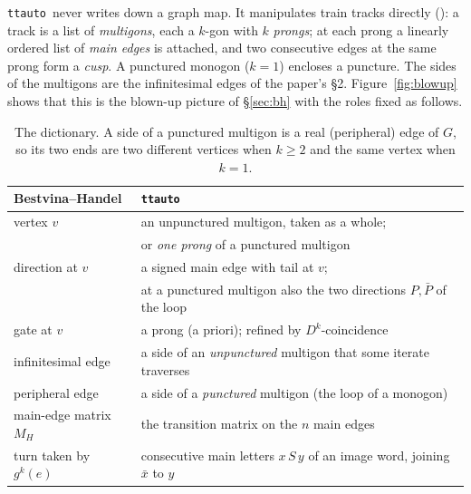 \documentclass[12pt]{amsart}
\newcommand{\anti}[1]{\bar{#1}}          %
\newcommand{\Dg}{D}                       %
\newcommand{\per}{P}                      %
\newcommand{\ttauto}{\texttt{ttauto}}
\theoremstyle{plain}
\theoremstyle{definition}
\begin{document}
\ttauto\ never writes down a graph map.  It manipulates train tracks
directly (\cite[\S2--3]{Lanneau2011}): a track is a list of
\emph{multigons}, each a $k$-gon with $k$ \emph{prongs}; at each prong a
linearly ordered list of \emph{main edges} is attached, and two consecutive
edges at the same prong form a \emph{cusp}.  A punctured monogon ($k=1$)
encloses a puncture.  The sides of the multigons are the infinitesimal
edges of the paper's \S2.  Figure~\ref{fig:blowup} shows that this is the
blown-up picture of \S\ref{sec:bh} with the roles fixed as follows.

\begin{table}[h]
  \centering
  \begin{tabular}{@{}ll@{}}
    \toprule
    Bestvina--Handel & \ttauto \\
    \midrule
    vertex $v$ & an unpunctured multigon, taken as a whole; \\
               & or \emph{one prong} of a punctured multigon \\
    direction at $v$ & a signed main edge with tail at $v$; \\
                     & at a punctured multigon also the two directions
                       $\per,\anti\per$ of the loop \\
    gate at $v$ & a prong (a priori); refined by $\Dg^k$-coincidence \\
    infinitesimal edge & a side of an \emph{unpunctured} multigon that
                         some iterate traverses \\
    peripheral edge & a side of a \emph{punctured} multigon (the loop of a
                      monogon) \\
    main-edge matrix $M_H$ & the transition matrix on the $n$ main edges \\
    turn taken by $g^k(e)$ & consecutive main letters $x\,S\,y$ of an image
                             word, joining $\anti x$ to $y$ \\
    \bottomrule
  \end{tabular}
  \caption{The dictionary.  A side of a punctured multigon is a real
    (peripheral) edge of $G$, so its two ends are two different vertices
    when $k\ge2$ and the same vertex when $k=1$.}
  \label{tab:dictionary}
\end{table}
\end{document}
